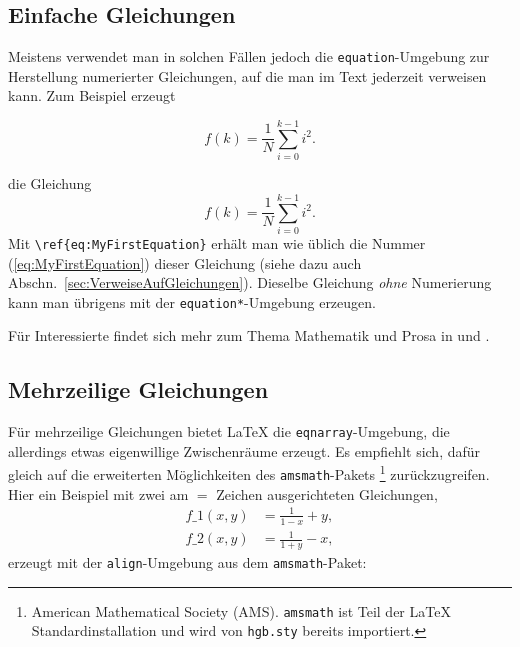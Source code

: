 \subsection{Einfache Gleichungen} 

Meistens verwendet man in solchen Fällen jedoch die \texttt{equation}-Umgebung zur Herstellung numerierter Gleichungen, auf die man im Text jederzeit verweisen kann. Zum Beispiel erzeugt
%

\begin{equation}
  f(k) = \frac{1}{N} \sum_{i=0}^{k-1} i^2 . 
  \label{eq:MyFirstEquation}
\end{equation}

%
die Gleichung
%
\begin{equation}
  f(k) = \frac{1}{N} \sum_{i=0}^{k-1} i^2 . 
\label{eq:MyFirstEquation}
\end{equation}
%
Mit \verb!\ref{eq:MyFirstEquation}! erhält man wie üblich die Nummer (\ref{eq:MyFirstEquation}) dieser Gleichung (siehe dazu auch Abschn.\ \ref{sec:VerweiseAufGleichungen}). 
Dieselbe Gleichung \emph{ohne} Numerierung kann man übrigens mit der \texttt{equation*}-Umgebung erzeugen.



\begin{center}
\setlength{\fboxrule}{0.2mm}
\setlength{\fboxsep}{2mm}
\end{center}
%
Für Interessierte findet sich mehr zum Thema Mathematik und Prosa in \cite{Mermin89} und \cite{Higham98}.

\subsection{Mehrzeilige Gleichungen}

Für mehrzeilige Gleichungen bietet LaTeX die 
\verb!eqnarray!-Umgebung, die allerdings etwas eigenwillige Zwischenräume erzeugt.
Es empfiehlt sich, dafür gleich auf die erweiterten Möglichkeiten des \texttt{amsmath}-Pakets%
\footnote{American Mathematical Society (AMS). \texttt{amsmath} ist Teil der LaTeX Standardinstallation und wird von \texttt{hgb.sty} bereits importiert.}
\cite{amsldoc02} zurückzugreifen.
Hier ein Beispiel mit zwei am $=$ Zeichen ausgerichteten Gleichungen,
%
\begin{align}
f\_1 (x,y) &= \frac{1}{1-x} + y , \label{eq:f1} \\
f\_2 (x,y) &= \frac{1}{1+y} - x , \label{eq:f2}
\end{align}
%
erzeugt mit der \texttt{align}-Umgebung aus dem \texttt{amsmath}-Paket:
%

